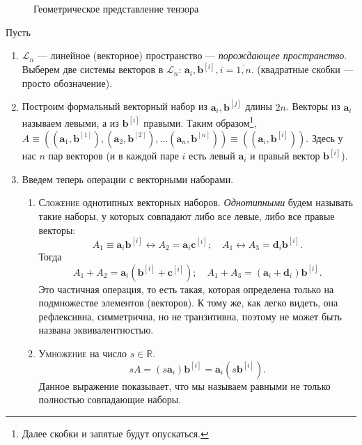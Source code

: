 \begin{figure}[ht!]
	\centering
	
	\caption{Геометрическое представление тензора}
	\label{fig:que2}
\end{figure}
\begin{definition}[геометрическое]
	Пусть
	\begin{enumerate}
		\item $\mathcal{L}_n$ --- линейное (векторное) пространство --- \emph{порождающее пространство}.
		Выберем две системы векторов в $\mathcal{L}_n$: $\mathbf{a}_i, \mathbf{b}^{[i]}, i = \overline{1, n}$.
		(квадратные скобки --- просто обозначение).
		
		\item Построим формальный векторный набор из $\mathbf{a}_i,
		\mathbf{b}^{[j]}$ длины $2n$.
		Векторы из $\mathbf{a}_i$ называем левыми, а из $\mathbf{b}^{[i]}$
		правыми. Таким образом\footnote{Далее скобки и запятые будут опускаться.}, 
		$A \equiv ((\mathbf{a}_1, \mathbf{b}^{[1]}), (\mathbf{a}_2,
		\mathbf{b}^{[2]}), \dots (\mathbf{a}_n, \mathbf{b}^{[n]}))
		\equiv ((\mathbf{a}_i, \mathbf{b}^{[i]}))$.
		Здесь у нас $ n $ пар векторов (и в каждой паре $ i $ есть левый $\mathbf{a}_i$ и правый вектор
		$\mathbf{b}^{[i]}$).
		
		\item Введем теперь операции с векторными наборами.
		\begin{enumerate}
			\item \textsc{Сложение} однотипных векторных наборов. \emph{Однотипными} будем называть такие наборы, у 
			которых совпадают либо все левые, либо все правые векторы:
			\[
			A_1 \equiv \mathbf{a}_i \mathbf{b}^{[i]} \leftrightarrow A_2 = \mathbf{a}_i \mathbf{c}^{[i]}; 
			\quad
			A_1 \leftrightarrow A_3 = \mathbf{d}_i \mathbf{b}^{[i]}.
			\]
			Тогда
			\[
			A_1+A_2 = \mathbf{a}_i (\mathbf{b}^{[i]} + \mathbf{c}^{[i]}); \quad
			A_1+A_3 = (\mathbf{a}_i + \mathbf{d}_i) \mathbf{b}^{[i]}.
			\]
			Это частичная операция, то есть такая, которая определена только на
			подмножестве элементов (векторов). К тому же, как легко видеть, она рефлексивна,
			симметрична, но не транзитивна, поэтому не может быть названа
			эквивалентностью.
			
			\item \textsc{Умножение} на число $s \in \mathbb{R}$.
			\[
			sA = (s \mathbf{a}_i) \mathbf{b}^{[i]} = \mathbf{a}_i (s \mathbf{b}^{[i]}).
			\]
			Данное выражение показывает, что мы называем равными не только
			полностью совпадающие наборы.
			

\end{enumerate}
\end{enumerate}
\end{definition}
